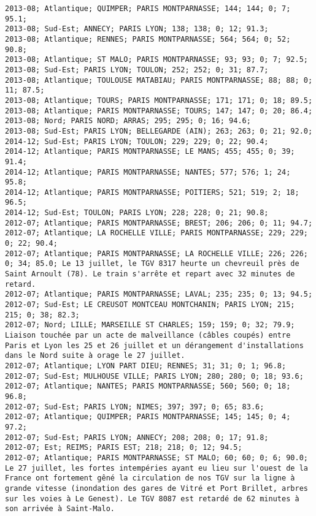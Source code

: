 \documentclass{article}
\begin{document}
\begin{Verbatim}[commandchars=\\\{\}]
2013-08; Atlantique; QUIMPER; PARIS MONTPARNASSE; 144; 144; 0; 7; 95.1; 
2013-08; Sud-Est; ANNECY; PARIS LYON; 138; 138; 0; 12; 91.3; 
2013-08; Atlantique; RENNES; PARIS MONTPARNASSE; 564; 564; 0; 52; 90.8; 
2013-08; Atlantique; ST MALO; PARIS MONTPARNASSE; 93; 93; 0; 7; 92.5; 
2013-08; Sud-Est; PARIS LYON; TOULON; 252; 252; 0; 31; 87.7; 
2013-08; Atlantique; TOULOUSE MATABIAU; PARIS MONTPARNASSE; 88; 88; 0; 11; 87.5; 
2013-08; Atlantique; TOURS; PARIS MONTPARNASSE; 171; 171; 0; 18; 89.5; 
2013-08; Atlantique; PARIS MONTPARNASSE; TOURS; 147; 147; 0; 20; 86.4; 
2013-08; Nord; PARIS NORD; ARRAS; 295; 295; 0; 16; 94.6; 
2013-08; Sud-Est; PARIS LYON; BELLEGARDE (AIN); 263; 263; 0; 21; 92.0; 
2014-12; Sud-Est; PARIS LYON; TOULON; 229; 229; 0; 22; 90.4; 
2014-12; Atlantique; PARIS MONTPARNASSE; LE MANS; 455; 455; 0; 39; 91.4; 
2014-12; Atlantique; PARIS MONTPARNASSE; NANTES; 577; 576; 1; 24; 95.8; 
2014-12; Atlantique; PARIS MONTPARNASSE; POITIERS; 521; 519; 2; 18; 96.5; 
2014-12; Sud-Est; TOULON; PARIS LYON; 228; 228; 0; 21; 90.8; 
2012-07; Atlantique; PARIS MONTPARNASSE; BREST; 206; 206; 0; 11; 94.7; 
2012-07; Atlantique; LA ROCHELLE VILLE; PARIS MONTPARNASSE; 229; 229; 0; 22; 90.4; 
2012-07; Atlantique; PARIS MONTPARNASSE; LA ROCHELLE VILLE; 226; 226; 0; 34; 85.0; Le 13 juillet, le TGV 8317 heurte un chevreuil près de Saint Arnoult (78). Le train s'arrête et repart avec 32 minutes de retard.
2012-07; Atlantique; PARIS MONTPARNASSE; LAVAL; 235; 235; 0; 13; 94.5; 
2012-07; Sud-Est; LE CREUSOT MONTCEAU MONTCHANIN; PARIS LYON; 215; 215; 0; 38; 82.3; 
2012-07; Nord; LILLE; MARSEILLE ST CHARLES; 159; 159; 0; 32; 79.9; Liaison touchée par un acte de malveillance (câbles coupés) entre Paris et Lyon les 25 et 26 juillet et un dérangement d'installations dans le Nord suite à orage le 27 juillet.
2012-07; Atlantique; LYON PART DIEU; RENNES; 31; 31; 0; 1; 96.8; 
2012-07; Sud-Est; MULHOUSE VILLE; PARIS LYON; 280; 280; 0; 18; 93.6; 
2012-07; Atlantique; NANTES; PARIS MONTPARNASSE; 560; 560; 0; 18; 96.8; 
2012-07; Sud-Est; PARIS LYON; NIMES; 397; 397; 0; 65; 83.6; 
2012-07; Atlantique; QUIMPER; PARIS MONTPARNASSE; 145; 145; 0; 4; 97.2; 
2012-07; Sud-Est; PARIS LYON; ANNECY; 208; 208; 0; 17; 91.8; 
2012-07; Est; REIMS; PARIS EST; 218; 218; 0; 12; 94.5; 
2012-07; Atlantique; PARIS MONTPARNASSE; ST MALO; 60; 60; 0; 6; 90.0; Le 27 juillet, les fortes intempéries ayant eu lieu sur l'ouest de la France ont fortement gêné la circulation de nos TGV sur la ligne à grande vitesse (inondation des gares de Vitré et Port Brillet, arbres sur les voies à Le Genest). Le TGV 8087 est retardé de 62 minutes à son arrivée à Saint-Malo.

\end{Verbatim}
\end{document}
